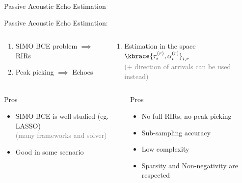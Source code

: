 \begin{frame}[t]{Passive Acoustic Echo Estimation}
\begin{block}{\alert{Passive} Acoustic Echo Estimation:}
        \vspace{.5em}
        \begin{columns}[T,onlytextwidth] %
            \begin{column}{.48\textwidth}
                \begin{enumerate}
                    \item SIMO BCE problem $\implies$ RIRs
                    \item Peak picking $\implies$ Echoes
                \end{enumerate}
            \end{column}
            \begin{column}{.48\textwidth}
                \begin{enumerate}
                    \item Estimation in the space $\kbrace{\tau_i^{(r)},\alpha_i^{(r)}}_{i,r}$
                    \\\textcolor{gray}{(+ \small direction of arrivals can be used instead)}
                \end{enumerate}
            \end{column}%
        \end{columns}
        \pause

        \vspace{1em}
        \begin{columns}[T,onlytextwidth] %
            \begin{column}{.48\textwidth}
                Pros
                \begin{itemize}
                    \item SIMO BCE is well studied (eg. LASSO)%
                    \\\textcolor{gray}{\small (many frameworks and solver)}
                    \item Good in some scenario %
                \end{itemize}
            \end{column}
            \begin{column}{.48\textwidth}
                Pros
                \begin{itemize}
                    \item No full RIRs, no peak picking
                    \item Sub-sampling accuracy
                    \item Low complexity
                    \item Sparsity and Non-negativity are respected
                \end{itemize}
            \end{column}%
        \end{columns}
        \pause


\end{block}
\end{frame}
